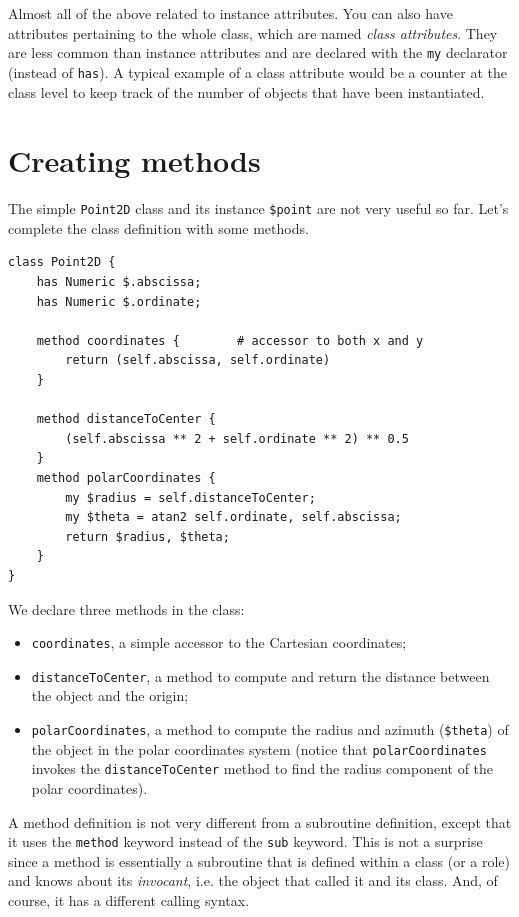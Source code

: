 Almost all of the above related to instance attributes. You 
can also have attributes pertaining to the whole class, which 
are named \emph{class attributes}. They are less common than 
instance attributes and are declared with the 
{\tt my} declarator (instead of {\tt has}). A typical example 
of a class attribute would be a counter at the class level 
to keep track of the number of objects that have been 
instantiated. 


\section{Creating methods}

The simple {\tt Point2D} class and its instance \verb'$point' 
are not very useful so far. Let's complete the class definition 
with some methods.

\begin{verbatim}
class Point2D {
    has Numeric $.abscissa;
    has Numeric $.ordinate;
    
    method coordinates {        # accessor to both x and y
        return (self.abscissa, self.ordinate)
    }
    
    method distanceToCenter {
        (self.abscissa ** 2 + self.ordinate ** 2) ** 0.5
    }
    method polarCoordinates {
        my $radius = self.distanceToCenter;
        my $theta = atan2 self.ordinate, self.abscissa;
        return $radius, $theta;
    }
}
\end{verbatim}

We declare three methods in the class:
\begin{itemize}
\item {\tt coordinates}, a simple accessor to the Cartesian 
coordinates;

\item{\tt distanceToCenter}, a method to compute and return 
the distance between the object and the origin;

\item{\tt polarCoordinates}, a method to compute the radius 
and azimuth (\verb'$theta') of the object in the polar 
coordinates system (notice that {\tt polarCoordinates} 
invokes the {\tt distanceToCenter} method to find the radius 
component of the polar coordinates).
\end{itemize}

A method definition is not very different from a subroutine 
definition, except that it uses the {\tt method} keyword 
instead of the {\tt sub} keyword. This is not a surprise 
since a method is essentially a subroutine that is defined 
within a class (or a role) and knows about its 
\emph{invocant}, i.e. the object that called it and its class. 
And, of course, it has a different calling syntax.

